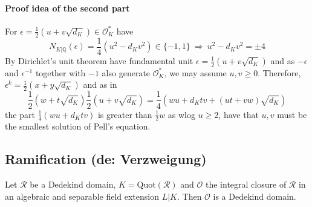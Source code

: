 \documentclass{scrartcl}
\newcommand{\Q}{\mathbb{Q}}
\begin{document}
\paragraph{Proof idea of the second part} For $\epsilon = \frac 1 2 (u + v \sqrt{d_K}) \in \mathcal{O}_K^*$ have
\begin{equation*}
    N_{K|\Q}(\epsilon) = \frac 1 4 (u^2 - d_K v^2) \in \{ -1, 1 \} \ \Rightarrow \ u^2 - d_K v^2 = \pm 4
\end{equation*}
By Dirichlet's unit theorem have fundamental unit $\epsilon = \frac 1 2 (u + v \sqrt{d_K})$ and as $-\epsilon$ and $\epsilon^{-1}$ together with $-1$ also generate $\mathcal{O}_K^*$, we may assume $u, v \geq 0$.
Therefore, $\epsilon^k = \frac 1 2 (x + y\sqrt{d_K})$ and as in
\begin{equation*}
    \frac 1 2 (w + t\sqrt{d_K})\frac 1 2 (u + v \sqrt{d_K}) = \frac 1 4 (wu + d_K tv + (ut + vw)\sqrt{d_K})
\end{equation*}
the part $\frac 1 4 (wu + d_K tv)$ is greater than $\frac 1 2 w$ as wlog $u \geq 2$, have that $u, v$ must be the smallest solution of Pell's equation.

\subsection{Ramification (de: Verzweigung)}
Let $\mathcal{R}$ be a Dedekind domain, $K = \mathrm{Quot}(\mathcal{R})$ and $\mathcal{O}$ the integral closure of $\mathcal{R}$ in an algebraic and separable field extension $L|K$. Then $\mathcal{O}$ is a Dedekind domain.
\end{document}
